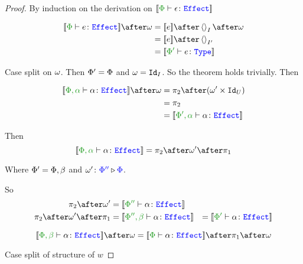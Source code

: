\documentclass{report}
\begin{document}
\begin{framed}
    \begin{proof}
        By induction on the derivation on $\deno{\typerelation{\P}{\e}{\effect}}$
        
        \begin{align*}
            \deno{\typerelation{\P}{e}{\effect}}\after\w & = \deno{e}\after\term{I}\after\w \\
            & = \deno{e}\after\term{I'} \\
            & = \deno{\typerelation{\P'}{e}{\type}}\\
        \end{align*}
        
        Case split on $\w$.
        \subcase{$\w = \i$}
        Then $\P' = \P$ and $\w = \Id{I}$. So the theorem holds trivially.
        Then
        
        \begin{align*}
            \deno{\typerelation{\P,\a}{\a}{\effect}}\after\w &= \pp\after(\w'\times \Id{U}) \\
            & = \pp\\
            & = \deno{\typerelation{\P',\a}{\a}{\effect}}
        \end{align*}
        
        Then \begin{equation}
            \deno{\typerelation{\P,\a}{\a}{\effect}} = \pp\after\w'\after\p
        \end{equation}
        
        Where $\P' = \P,\b$ and $\wrel{\w'}{\P''}{\P}$.
        
        So\begin{align*}
            \pp\after\w' & = \deno{\typerelation{\P''}{\a}{\effect}}
            \\
            \pp\after\w'\after\p & =\deno{\typerelation{\P'',\b}{\a}{\effect}}
            &= \deno{\typerelation{\P'}{\a}{\effect}}
        \end{align*}
        
        \begin{equation}
            \deno{\typerelation{\P,\b}{\a}{\effect}}\after\w = \deno{\typerelation{\P}{\a}{\effect}}\after\p\after\w
        \end{equation}
        
        Case split of structure of $w$
        

\end{proof}
\end{framed}
\end{document}
